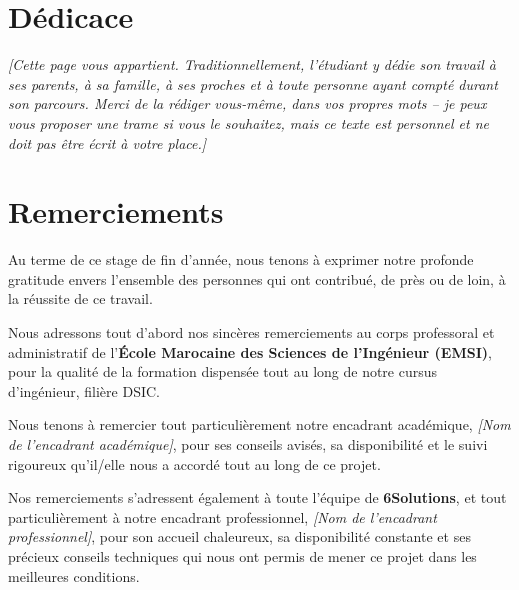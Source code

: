 \documentclass[12pt,a4paper]{report}
\newcommand{\placeholder}[1]{\par\smallskip\noindent\textcolor{placeholderred}{\itshape [#1]}\par\smallskip}
\begin{document}

\chapter*{Dédicace}

\placeholder{Cette page vous appartient. Traditionnellement, l'étudiant y dédie son travail à ses parents, à sa famille, à ses proches et à toute personne ayant compté durant son parcours. Merci de la rédiger vous-même, dans vos propres mots -- je peux vous proposer une trame si vous le souhaitez, mais ce texte est personnel et ne doit pas être écrit à votre place.}

\chapter*{Remerciements}

Au terme de ce stage de fin d'année, nous tenons à exprimer notre profonde gratitude envers l'ensemble des personnes qui ont contribué, de près ou de loin, à la réussite de ce travail.

Nous adressons tout d'abord nos sincères remerciements au corps professoral et administratif de l'\textbf{École Marocaine des Sciences de l'Ingénieur (EMSI)}, pour la qualité de la formation dispensée tout au long de notre cursus d'ingénieur, filière DSIC.

Nous tenons à remercier tout particulièrement notre encadrant académique, \textcolor{placeholderred}{\itshape [Nom de l'encadrant académique]}, pour ses conseils avisés, sa disponibilité et le suivi rigoureux qu'il/elle nous a accordé tout au long de ce projet.

Nos remerciements s'adressent également à toute l'équipe de \textbf{6Solutions}, et tout particulièrement à notre encadrant professionnel, \textcolor{placeholderred}{\itshape [Nom de l'encadrant professionnel]}, pour son accueil chaleureux, sa disponibilité constante et ses précieux conseils techniques qui nous ont permis de mener ce projet dans les meilleures conditions.
\end{document}
